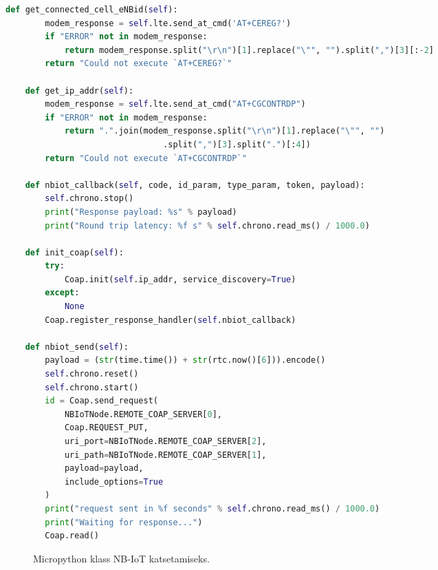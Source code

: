 \documentclass[12pt]{article}
\begin{document}
\begin{spacing}{0.8}
\begin{lstlisting}[language=Python]
    def get_connected_cell_eNBid(self):
        modem_response = self.lte.send_at_cmd('AT+CEREG?')
        if "ERROR" not in modem_response:
            return modem_response.split("\r\n")[1].replace("\"", "").split(",")[3][:-2]
        return "Could not execute `AT+CEREG?`"

    def get_ip_addr(self):
        modem_response = self.lte.send_at_cmd("AT+CGCONTRDP")
        if "ERROR" not in modem_response:
            return ".".join(modem_response.split("\r\n")[1].replace("\"", "")
                                .split(",")[3].split(".")[:4])
        return "Could not execute `AT+CGCONTRDP`"

    def nbiot_callback(self, code, id_param, type_param, token, payload):
        self.chrono.stop()
        print("Response payload: %s" % payload)
        print("Round trip latency: %f s" % self.chrono.read_ms() / 1000.0)

    def init_coap(self):
        try:
            Coap.init(self.ip_addr, service_discovery=True)
        except:
            None
        Coap.register_response_handler(self.nbiot_callback)

    def nbiot_send(self):
        payload = (str(time.time()) + str(rtc.now()[6])).encode()
        self.chrono.reset()
        self.chrono.start()
        id = Coap.send_request(
            NBIoTNode.REMOTE_COAP_SERVER[0],
            Coap.REQUEST_PUT,
            uri_port=NBIoTNode.REMOTE_COAP_SERVER[2],
            uri_path=NBIoTNode.REMOTE_COAP_SERVER[1],
            payload=payload,
            include_options=True
        )
        print("request sent in %f seconds" % self.chrono.read_ms() / 1000.0)
        print("Waiting for response...")
        Coap.read()

        \end{lstlisting}
    \end{spacing}
    \begin{figure}[h]
    \caption{Micropython klass NB-IoT katsetamiseks.}
    \label{fig:codenbiot}
    \end{figure}
\end{document}
